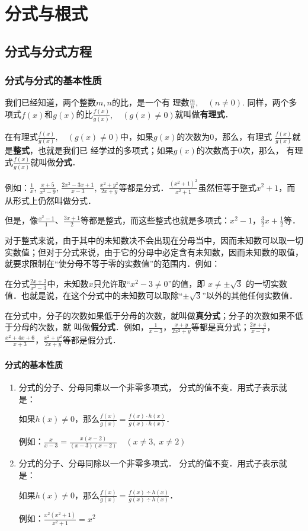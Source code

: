 \chapter{分式与根式}
\section{分式与分式方程}
\subsection{分式与分式的基本性质}
我们已经知道，两个整数$m,n$的比，是一个有
理数$\frac{m}{n},\quad (n\ne 0)$. 同样，两个多项式$f(x)$和$g(x)$的比$\frac{f(x)}{g(x)},\quad (g(x)\ne 0)$就叫做\textbf{有理式}．

在有理式$\frac{f(x)}{g(x)},\quad (g(x)\ne 0)$中，如果$g(x)$的次数为0，那么，有理式
$\frac{f(x)}{g(x)}$就是\textbf{整式}，也就是我们已
经学过的多项式；如果$g(x)$的次数高于0次，那么，
有理式$\frac{f(x)}{g(x)}$就叫做\textbf{分式}．

例如：$\frac{1}{x}$, $\frac{x+5}{x^2-9}$, $\frac{2x^2-3x+1}{x-3}$, $\frac{x^2+y^2}{2x+y}$等都是分式．$\frac{(x^2+1)^2}{x^2+1}$虽然恒等于整式$x^2+1$，而从形式上仍然叫做分式．

但是，像$\frac{x^2-1}{1}$、$\frac{3x+1}{2}$等都是整式，而这些整式也就是多项式：$x^2-1$，$\frac{3}{2}x+\frac{1}{2}$等．

对于整式来说，由于其中的未知数决不会出现在分母当中，因而未知数可以取一切实数值；但对于分式来说，由于它的分母中必定含有未知数，因而未知数的取值，就要求限制在“使分母不等于零的实数值”的范围内．例如：

在分式$\frac{2x+3}{x^2-3}$中，未知数$x$只允许取“$x^2-3\ne 0$”的值，即
$x\ne \pm\sqrt{3}$
的一切实数值．也就是说，在这个分式中的未知数可以取除“$\pm\sqrt{3}$”以外的其他任何实数值．

在分式中，分子的次数如果低于分母的次数，就叫做\textbf{真分式}；分子的次数如果不低于分母的次数，就
叫做\textbf{假分式}．例如，$\frac{1}{x-3}$，$\frac{x+y}{2x^2+y}$等都是真分式；$\frac{2x+4}{x-3}$，$\frac{x^2+4x+6}{x+3}$，$\frac{x^2+y^2}{2x+y}$等都是假分式．

\subsubsection{分式的基本性质}

\begin{enumerate}
\item 分式的分子、分母同乘以一个非零多项式，
分式的值不变．用式子表示就是：

如果$h(x)\ne 0$，那么$\frac{f(x)}{g(x)}=\frac{f(x)\cdot h(x)}{g(x)\cdot h(x)}$．

例如：$\frac{x}{x-3}=\frac{x(x-2)}{(x-3)(x-2)}\quad (x\ne 3,\; x\ne 2)$

\item 分式的分子、分母同除以一个非零多项式．
分式的值不变．用式子表示就是：

如果$h(x)\ne 0$，那么$\frac{f(x)}{g(x)}=\frac{f(x)\div h(x)}{g(x)\div h(x)}$．

例如：$\frac{x^2(x^2+1)}{x^2+1}=x^2$
\end{enumerate}

